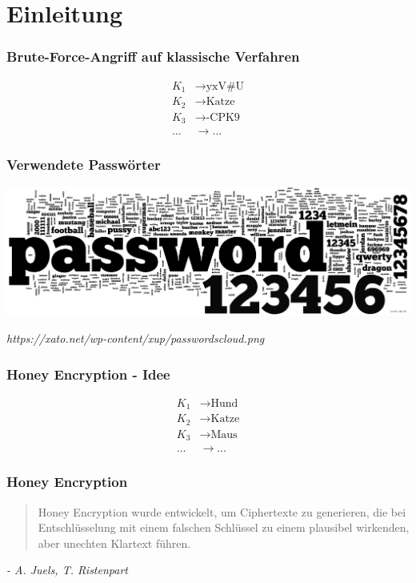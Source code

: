 \section{Einleitung}

\begin{frame}[c]
	\frametitle{Brute-Force-Angriff auf klassische Verfahren}

	\begin{align*}
		K_1 &\rightarrow \text{yxV\#U}\\
		K_2 &\rightarrow \text{Katze}\\
		K_3 &\rightarrow \text{-CPK9}\\
		\dots &\rightarrow \dots
	\end{align*}

\end{frame}

\begin{frame}[c]
	\frametitle{Verwendete Passwörter}

	\begin{center}
		\includegraphics[width=\textwidth]{pic/passwordscloud.png}
		\vspace*{.5cm}
	\end{center}
	\hfill \tiny{\emph{https://xato.net/wp-content/xup/passwordscloud.png}}
\end{frame}

\begin{frame}[c]
	\frametitle{Honey Encryption - Idee}

	\begin{align*}
		K_1 &\rightarrow \text{Hund}\\
		K_2 &\rightarrow \text{Katze}\\
		K_3 &\rightarrow \text{Maus}\\
		\dots &\rightarrow \dots
	\end{align*}
	
\end{frame}

\begin{frame}[c]
	\frametitle{Honey Encryption}

	\begin{quote}
		Honey Encryption wurde entwickelt, um Ciphertexte zu generieren, die bei Entschlüsselung mit einem falschen Schlüssel zu einem plausibel wirkenden, aber unechten Klartext führen.
	\end{quote}
	
	\vspace*{1cm}

	\hfill \textit{- A. Juels, T. Ristenpart}
\end{frame}